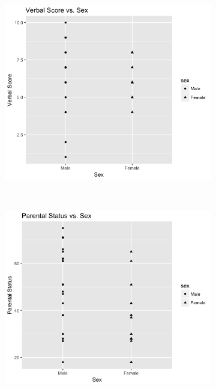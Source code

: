 \documentclass{exam}
\begin{document}
\pagebreak
\begin{figure}[t!]
	\begin{subfigure}
	\centering
	\includegraphics[scale=0.7]{Verbal_V_sex}
	\end{subfigure}
	~
	\begin{subfigure}
	\centering
	\includegraphics[scale=0.7]{Status_V_sex}
	\end{subfigure}

\end{figure}
\end{document}
